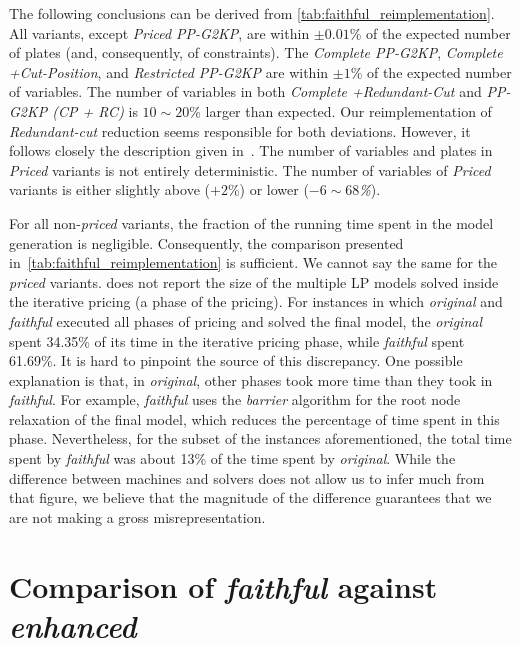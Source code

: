 \documentclass[ppgc,prop-tese,english,formais,babel]{iiufrgs}
\begin{document}
The following conclusions can be derived from \cref{tab:faithful_reimplementation}.
All variants, except \emph{Priced PP-G2KP}, are within \(\pm0.01\)\% of the expected number of plates (and, consequently, of constraints).
The \emph{Complete PP-G2KP}, \emph{Complete +Cut-Position}, and \emph{Restricted PP-G2KP} are within \(\pm1\)\% of the expected number of variables.
The number of variables in both \emph{Complete +Redundant-Cut} and \emph{PP-G2KP (CP + RC)} is \(10\sim20\)\% larger than expected.
Our reimplementation of \emph{Redundant-cut} reduction seems responsible for both deviations.
However, it follows closely the description given in~\citet{dimitri_thesis}.
The number of variables and plates in \emph{Priced} variants is not entirely deterministic.
The number of variables of \emph{Priced} variants is either slightly above (\(+2\)\%) or lower (\emph{\(-6\sim68\)\%}).

For all non-\emph{priced} variants, the fraction of the running time spent in the model generation is negligible.
Consequently, the comparison presented in~\cref{tab:faithful_reimplementation} is sufficient.
We cannot say the same for the \emph{priced} variants.
\citet{dimitri_thesis} does not report the size of the multiple LP models solved inside the iterative pricing (a phase of the pricing).
For instances in which \emph{original} and \emph{faithful} executed all phases of pricing and solved the final model, the \emph{original} spent 34.35\% of its time in the iterative pricing phase, while \emph{faithful} spent 61.69\%.
It is hard to pinpoint the source of this discrepancy.
One possible explanation is that, in \emph{original}, other phases took more time than they took in \emph{faithful}.
For example, \emph{faithful} uses the \emph{barrier} algorithm for the root node relaxation of the final model, which reduces the percentage of time spent in this phase.
Nevertheless, for the subset of the instances aforementioned, the total time spent by \emph{faithful} was about 13\% of the time spent by \emph{original}.
While the difference between machines and solvers does not allow us to infer much from that figure, we believe that the magnitude of the difference guarantees that we are not making a gross misrepresentation.

\section{Comparison of \emph{faithful} against \emph{enhanced}}
\label{sec:comparison}
\end{document}
